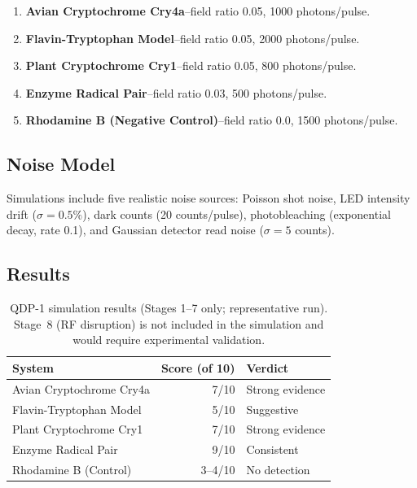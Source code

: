 \documentclass[preprint,amsmath,amssymb]{revtex4-2}
\begin{document}
\begin{enumerate}
\item \textbf{Avian Cryptochrome Cry4a}--field ratio 0.05, 1000 photons/pulse.
\item \textbf{Flavin-Tryptophan Model}--field ratio 0.05, 2000 photons/pulse.
\item \textbf{Plant Cryptochrome Cry1}--field ratio 0.05, 800 photons/pulse.
\item \textbf{Enzyme Radical Pair}--field ratio 0.03, 500 photons/pulse.
\item \textbf{Rhodamine B (Negative Control)}--field ratio 0.0, 1500 photons/pulse.
\end{enumerate}

\subsection{Noise Model}

Simulations include five realistic noise sources: Poisson shot noise, LED intensity drift ($\sigma = 0.5\%$), dark counts (20 counts/pulse), photobleaching (exponential decay, rate 0.1), and Gaussian detector read noise ($\sigma = 5$ counts).

\subsection{Results}

\begin{table}[h]
\caption{QDP-1 simulation results (Stages 1--7 only; representative run). Stage~8 (RF disruption) is not included in the simulation and would require experimental validation.}
\begin{ruledtabular}
\begin{tabular}{lrl}
System & Score (of 10) & Verdict \\
\hline
Avian Cryptochrome Cry4a & 7/10 & Strong evidence \\
Flavin-Tryptophan Model & 5/10 & Suggestive \\
Plant Cryptochrome Cry1 & 7/10 & Strong evidence \\
Enzyme Radical Pair & 9/10 & Consistent \\
Rhodamine B (Control) & 3--4/10 & No detection \\
\end{tabular}
\end{ruledtabular}
\end{table}
\end{document}
